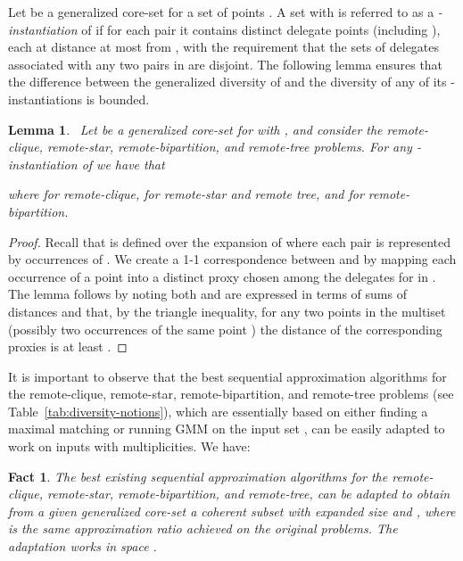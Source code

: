 \documentclass{article}
\newtheorem{lemma}{Lemma}
\newtheorem{fact}{Fact}
\begin{document}
Let  be a generalized core-set for a set of points . A set
 with  is referred to as a
\emph{-instantiation} of  if for each pair 
it contains  distinct delegate points (including ), each at
distance at most  from , with the requirement that the sets
of delegates associated with any two pairs in  are disjoint. The
following lemma
ensures that the difference between the generalized
diversity of  and the diversity of any of its
-instantiations is bounded.
 
\begin{lemma}\label{lem-gendiv}
  ~Let  be a generalized core-set for  with , and
  consider the remote-clique, remote-star, remote-bipartition, and
  remote-tree problems.  For any -instantiation  of 
  we have that
   
  where  for remote-clique,  for
  remote-star and remote tree, and
   for
  remote-bipartition.
\end{lemma}
\begin{proof}
 Recall that  is defined over the expansion 
 of  where each pair  is represented by 
 occurrences of .  We create a 1-1 correspondence between
  and  by mapping each occurrence of a point
  into a distinct proxy chosen among the delegates
 for  in . The lemma follows by noting both
  and  are expressed in terms of sums
 of  distances and that, by the triangle inequality, for any
 two points  in the multiset (possibly two occurrences of
 the same point ) the distance of the corresponding proxies is at
 least .
\end{proof}

It is important to observe that the best sequential approximation
algorithms for the remote-clique, remote-star, remote-bipartition, and
remote-tree problems (see Table~\ref{tab:diversity-notions}), which
are essentially based on either finding a maximal matching or running
{\sc GMM} on the input set
\cite{HassinRT97,ChandraH01,HalldorssonIKT99}, can be easily adapted
to work on inputs with multiplicities. We have:
\begin{fact}\label{fact:gen}
  The best existing sequential approximation algorithms for the
  remote-clique, remote-star, remote-bipartition, and remote-tree, can
  be adapted to obtain from a given generalized core-set  a
  coherent subset  with expanded size  and
  , where  is
  the same approximation ratio achieved on the original problems.
  The adaptation works in space .
\end{fact}
\end{document}
